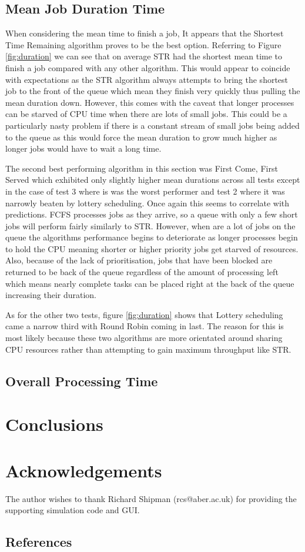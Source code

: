 \documentclass{acm_proc_article-sp}
\begin{document}
\subsection{Mean Job Duration Time}
When considering the mean time to finish a job, It appears that the Shortest Time Remaining algorithm proves to be the best option. Referring to Figure \ref{fig:duration} we can see that on average STR had the shortest mean time to finish a job compared with any other algorithm. This would appear to coincide with expectations as the STR algorithm always attempts to bring the shortest job to the front of the queue which mean they finish very quickly thus pulling the mean duration down. However, this comes with the caveat that longer processes can be starved of CPU time when there are lots of small jobs. This could be a particularly nasty problem if there is a constant stream of small jobs being added to the queue as this would force the mean duration to grow much higher as longer jobs would have to wait a long time.

The second best performing algorithm in this section was First Come, First Served which exhibited only slightly higher mean durations across all tests except in the case of test 3 where is was the worst performer and test 2 where it was narrowly beaten by lottery scheduling. Once again this seems to correlate with predictions. FCFS processes jobs as they arrive, so a queue with only a few short jobs will perform fairly similarly to STR. However, when are a lot of jobs on the queue the algorithms performance begins to deteriorate as longer processes begin to hold the CPU meaning shorter or higher priority jobs get starved of resources. Also, because of the lack of prioritisation, jobs that have been blocked are returned to be back of the queue regardless of the amount of processing left which means nearly complete tasks can be placed right at the back of the queue increasing their duration.

As for the other two tests, figure \ref{fig:duration} shows that Lottery scheduling came a narrow third with Round Robin coming in last. The reason for this is most likely because these two algorithms are more orientated around sharing CPU resources rather than attempting to gain maximum throughput like STR. 

\subsection{Overall Processing Time}

\section{Conclusions}

\section{Acknowledgements}
The author wishes to thank Richard Shipman (rcs@aber.ac.uk) for providing the supporting simulation code and GUI.


\appendix
\subsection{References}
\balancecolumns
\end{document}
